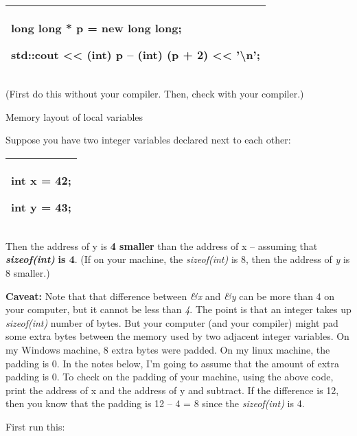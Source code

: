 \documentclass[
]{article}
\begin{document}
\begin{longtable}[]{@{}l@{}}
\toprule
\endhead
\begin{minipage}[t]{0.97\columnwidth}\raggedright
long long * p = new long long;

std::cout \textless\textless{} (int) p -- (int) (p + 2)
\textless\textless{} '\textbackslash n';\strut
\end{minipage}\tabularnewline
\bottomrule
\end{longtable}

(First do this without your compiler. Then, check with your compiler.)

Memory layout of local variables

Suppose you have two integer variables declared next to each other:

\begin{longtable}[]{@{}l@{}}
\toprule
\endhead
\begin{minipage}[t]{0.97\columnwidth}\raggedright
int x = 42;

int y = 43;\strut
\end{minipage}\tabularnewline
\bottomrule
\end{longtable}

Then the address of y is \textbf{4 smaller} than the address of x --
assuming that \emph{\textbf{sizeof(int)}}\textbf{ is 4}. (If on your
machine, the \emph{sizeof(int)} is 8, then the address of \emph{y} is 8
smaller.)

\textbf{Caveat:} Note that that difference between \emph{\&x} and
\emph{\&y} can be more than 4 on your computer, but it cannot be less
than \emph{4}. The point is that an integer takes up \emph{sizeof(int)}
number of bytes. But your computer (and your compiler) might pad some
extra bytes between the memory used by two adjacent integer variables.
On my Windows machine, 8 extra bytes were padded. On my linux machine,
the padding is 0. In the notes below, I'm going to assume that the
amount of extra padding is 0. To check on the padding of your machine,
using the above code, print the address of x and the address of y and
subtract. If the difference is 12, then you know that the padding is 12
-- 4 = 8 since the \emph{sizeof(int)} is 4.

First run this:
\end{document}
